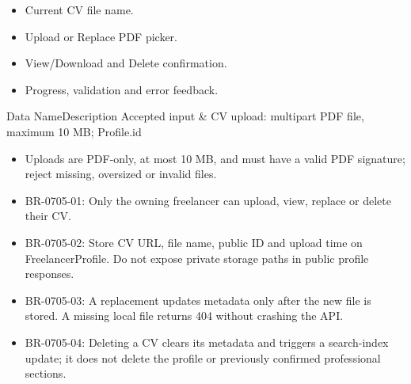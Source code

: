 \begin{itemize}[leftmargin=1.6em,topsep=3pt,itemsep=2pt,parsep=0pt,label=$\bullet$]
    \item Current CV file name.
    \item Upload or Replace PDF picker.
    \item View/Download and Delete confirmation.
    \item Progress, validation and error feedback.
\end{itemize}


\begin{specdatatable}{Data Name}{Description}
Accepted input & CV upload: multipart PDF file, maximum 10 MB; Profile.id\\ \hline
\end{specdatatable}

\begin{itemize}[leftmargin=1.6em,topsep=3pt,itemsep=2pt,parsep=0pt,label=$\bullet$]
    \item Uploads are PDF-only, at most 10 MB, and must have a valid PDF signature; reject missing, oversized or invalid files.
\end{itemize}

\begin{itemize}[leftmargin=1.6em,topsep=3pt,itemsep=2pt,parsep=0pt,label=$\bullet$]\brrulelist
    \item BR-0705-01: Only the owning freelancer can upload, view, replace or delete their CV.
    \item BR-0705-02: Store CV URL, file name, public ID and upload time on FreelancerProfile. Do not expose private storage paths in public profile responses.
    \item BR-0705-03: A replacement updates metadata only after the new file is stored. A missing local file returns 404 without crashing the API.
    \item BR-0705-04: Deleting a CV clears its metadata and triggers a search-index update; it does not delete the profile or previously confirmed professional sections.
\end{itemize}

